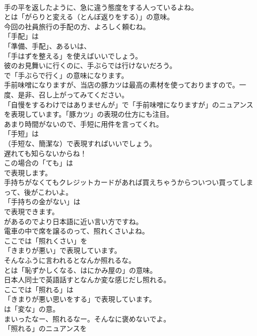 \documentclass[8pt]{extreport}
\begin{document}
\begin{CJK}{UTF8}{min}
\\	手の平を返したように、急に違う態度をする人っているよね。 
\\	とは「がらりと変える（とんぼ返りをする）」の意味。	
\\	今回の社員旅行の手配の方、よろしく頼むね。 
\\	「手配」は
\\	「準備、手配」、あるいは、
\\	「手はずを整える」を使えばいいでしょう。	
\\	彼のお見舞いに行くのに、手ぶらでは行けないだろう。 
\\	で「手ぶらで行く」の意味になります。	
\\	手前味噌になりますが、当店の豚カツは最高の素材を使っておりますので。一度、是非、召し上がってみてください。 
\\	「自慢をするわけではありませんが」で「手前味噌になりますが」のニュアンスを表現しています。「豚カツ」の表現の仕方にも注目。	
\\	あまり時間がないので、手短に用件を言ってくれ。 
\\	「手短」は 
\\	（手短な、簡潔な）で表現すればいいでしょう。	
\\	遅れても知らないからね！ 
\\	この場合の「ても」は
\\	で表現します。	
\\	手持ちがなくてもクレジットカードがあれば買えちゃうからついつい買ってしまって、後がこわいよ。 
\\	「手持ちの金がない」は
\\	で表現できます。
\\	があるのでより日本語に近い言い方ですね。	
\\	電車の中で席を譲るのって、照れくさいよね。 
\\	ここでは「照れくさい」を
\\	「きまりが悪い」で表現しています。	
\\	そんなふうに言われるとなんか照れるな。 
\\	とは「恥ずかしくなる、はにかみ屋の」の意味。	
\\	日本人同士で英語話すとなんか変な感じだし照れる。 
\\	ここでは「照れる」は
\\	「きまりが悪い思いをする」で表現しています。
\\	は「変な」の意。	
\\	まいったなー、照れるなー。そんなに褒めないでよ。 
\\	「照れる」のニュアンスを

\end{CJK}
\end{document}
